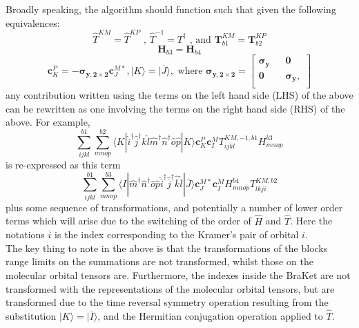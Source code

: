 \documentclass[12pt]{article}
\begin{document}
\noindent Broadly speaking, the algorithm should function such that
given the following equivalences:
\begin{equation*}
\hat{T}^{KM}= \hat{T}^{KP} \text{\ , \ \ \  }
\hat{T}^{-1} = T^{\dagger} \text{\ , and \ \ \ }
\mathbf{T}_{b1}^{KM}= \mathbf{T}_{b2}^{KP} 
\end{equation*}
\begin{equation*} 
\mathbf{H}_{b3} = \mathbf{H}_{b4} 
\end{equation*}
\begin{equation*} 
\mathbf{c}_{K}^{P} =  -\boldsymbol{\sigma_{y,2\times 2}}\mathbf{c}_{J}^{M*}, 
|K\rangle =  |\overline{J}\rangle, 
\text{ \ \ \ where  \ \ \ } 
\boldsymbol{\sigma_{y,2\times 2}} = 
\begin{bmatrix}
\boldsymbol{\sigma_{y}} && \mathbf{0} \\ 
\mathbf{0} && \boldsymbol{\sigma_{y}}, \\
\end{bmatrix}
\end{equation*}
\noindent any contribution written using the terms on the left
hand side (LHS) of the above can be rewritten as one involving the terms on the
right hand side (RHS) of the above. For example, 
\begin{equation*}
\sum_{ijkl}^{b1}\sum_{mnop}^{b2} \langle K |
\hat{i}^{\dagger}\hat{j}^{\dagger}\hat{k}\hat{l}\hat{m}^{\dagger}\hat{n}^{\dagger}\hat{o}\hat{p} | K \rangle 
\mathbf{c}_{K}^{P}\mathbf{c}_{I}^{M}T_{ijkl}^{KM,-1,b1}H^{b3}_{mnop}
\end{equation*}
is re-expressed as this term
\begin{equation*}
\sum_{ijkl}^{b1}\sum^{b3}_{mnop}
\langle I |
\hat{m}^{\dagger}\hat{n}^{\dagger}\hat{o}\hat{p} 
\hat{\overline{i}}^{\dagger}\hat{\overline{j}}^{\dagger}\hat{\overline{k}}\hat{\overline{l}}
| \overline{J} \rangle 
\mathbf{c}_{J}^{M*} \mathbf{c}_{I}^{M}
H^{b4}_{mnop}T_{lkji}^{KM,b2}
\end{equation*}
plus some sequence of transformations, and potentially a number of lower order
terms which will arise due to the switching of the order of $\hat{H}$ and
$\hat{T}$. Here the notations $\overline{i}$ is the index corresponding to the
Kramer's pair of orbital $i$. \\

\noindent The key thing to note in the above is that the transformations of the
blocks range limits on the summations are not transformed, whilst those on the
molecular orbital tensors are. Furthermore, the indexes inside the BraKet are
not transformed with the representations of the molecular orbital tensors, but
are transformed due to the time reversal symmetry operation resulting from the
substitution $|K\rangle = |\overline{I}\rangle$, and the Hermitian conjugation
operation applied to $\hat{T}$.\\
\end{document}
